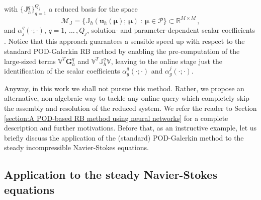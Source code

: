 \documentclass[12pt, a4paper, twoside, openright]{report}
\numberwithin{equation}{chapter}
\theoremstyle{theorem}
\theoremstyle{definition}
\theoremstyle{remark}
\theoremstyle{proposition}
\numberwithin{figure}{chapter}
\newcommand{\bg}[1]{\boldsymbol{#1}}
\begin{document}
		with $\big\lbrace \mathbb{J}_h^q \big\rbrace_{q = 1}^{Q_j}$ a reduced basis for the space
		\begin{equation*}
			\mathcal{M}_{\mathbb{J}} = \big\lbrace \mathbb{J}_h(\mathbf{u}_h(\bg{\mu}); \, \bg{\mu}) ~ : ~ \bg{\mu} \in \mathcal{P} \big\rbrace \subset \mathbb{R}^{M \times M} \, ,
		\end{equation*}
		and $\alpha_j^q(\cdot; \cdot)$, $q = 1, \, \ldots \, , Q_j$, solution- and parameter-dependent scalar coefficients \cite{QMN15}. Notice that this approach guarantees a sensible speed up with respect to the standard POD-Galerkin RB method by enabling the pre-computation of the large-sized terms $\mathbb{V}^T \mathbf{G}_h^q$ and $\mathbb{V}^T \mathbb{J}_h^q \mathbb{V}$, leaving to the online stage just the identification of the scalar coefficients $\alpha_g^q(\cdot; \cdot)$ and $\alpha_g^j(\cdot; \cdot)$. 
		
		Anyway, in this work we shall not pursue this method. Rather, we propose an alternative, non-algebraic way to tackle any online query which completely skip the assembly and resolution of the reduced system. We refer the reader to Section \ref{section:A POD-based RB method using neural networks} for a complete description and further motivations. Before that, as an instructive example, let us briefly discuss the application of the (standard) POD-Galerkin method to the steady incompressible Navier-Stokes equations.
		
	\vspace*{0.3cm}
		
	\subsection{Application to the steady Navier-Stokes equations}
	\label{section:Application to the steady Navier-Stokes equations}
	
\end{document}
